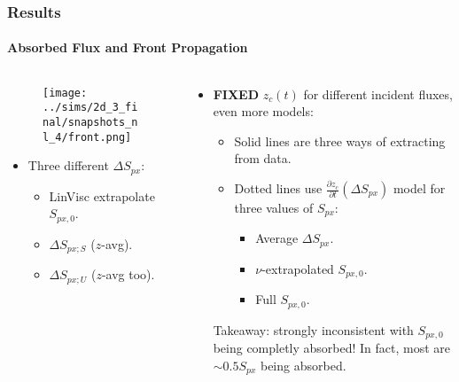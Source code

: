 \documentclass[dvipsnames]{beamer}
\newcommand*{\pd}[2]{\frac{\partial#1}{\partial#2}}
\begin{document}
\begin{frame}
    \frametitle{Results}
    \framesubtitle{Absorbed Flux and Front Propagation}

    \begin{columns}
        \begin{column}{0.5\textwidth}
            \begin{figure}[t]
                \centering
                \texttt{[image: ../sims/2d\_3\_final/snapshots\_nl\_4/front.png]}
            \end{figure}
            \begin{itemize}
                \item Three different $\Delta S_{px}$:
                    \begin{itemize}
                        \item LinVisc extrapolate $S_{px, 0}$.

                        \item $\Delta S_{px; S}$ ($z$-avg).

                        \item $\Delta S_{px; U}$ ($z$-avg too).
                    \end{itemize}
            \end{itemize}
        \end{column}
        \begin{column}{0.5\textwidth}
            \begin{itemize}

                \item \textbf{FIXED} $z_c(t)$ for different incident fluxes,
                    even more models:
                    \begin{itemize}
                        \item Solid lines are three ways of extracting from
                            data.

                        \item Dotted lines use $\pd{z_c}{t}(\Delta S_{px})$
                            model for three values of $S_{px}$:
                            \begin{itemize}
                                \item Average $\Delta S_{px}$.
                                \item $\nu$-extrapolated $S_{px, 0}$.
                                \item Full $S_{px, 0}$.
                            \end{itemize}
                    \end{itemize}
                    Takeaway: strongly inconsistent with $S_{px, 0}$ being
                    completly absorbed! In fact, most are $\sim 0.5S_{px}$ being
                    absorbed.
            \end{itemize}
        \end{column}
    \end{columns}
\end{frame}
\end{document}
